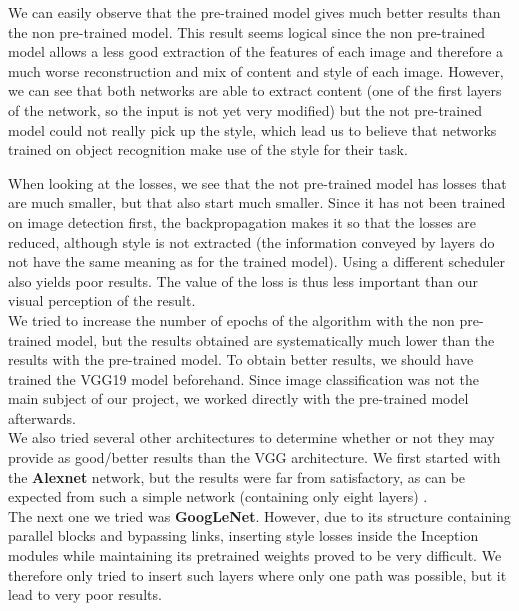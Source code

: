 \documentclass[twocolumn,superscriptaddress,aps,floatfix,nofootinbib]{revtex4-1}
\begin{document}
    We can easily observe that the pre-trained model gives much better results than the non pre-trained model. This result seems logical since the non pre-trained model allows a less good extraction of the features of each image and therefore a much worse reconstruction and mix of content and style of each image. However, we can see that both networks are able to extract content (one of the first layers of the network, so the input is not yet very modified) but the not pre-trained model could not really pick up the style, which lead us to believe that networks trained on object recognition make use of the style for their task.
    
    When looking at the losses, we see that the not pre-trained model has losses that are much smaller, but that also start much smaller. Since it has not been trained on image detection first, the backpropagation makes it so that the losses are reduced, although style is not extracted (the information conveyed by layers do not have the same meaning as for the trained model). Using a different scheduler also yields poor results. The value of the loss is thus less important than our visual perception of the result.\\
    
    We tried to increase the number of epochs of the algorithm with the non pre-trained model, but the results obtained are systematically much lower than the results with the pre-trained model. To obtain better results, we should have trained the VGG19 model beforehand. Since image classification was not the main subject of our project, we worked directly with the pre-trained model afterwards.\\
    
    We also tried several other architectures to determine whether or not they may provide as good/better results than the VGG architecture. We first started with the \textbf{Alexnet} network, but the results were far from satisfactory, as can be expected from such a simple network (containing only eight layers) \cite{Krizhevsky2012ImageNetCW}.\\
    
    The next one we tried was \textbf{GoogLeNet}. However, due to its structure containing parallel blocks and bypassing links, inserting style losses inside the Inception modules while maintaining its pretrained weights proved to be very difficult. We therefore only tried to insert such layers where only one path was possible, but it lead to very poor results.\\
    
\end{document}
